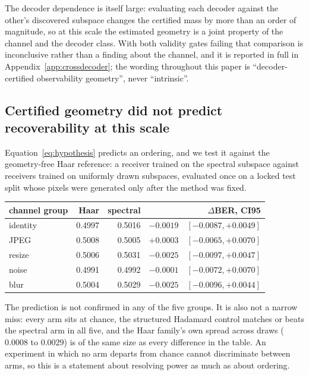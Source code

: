 \documentclass{article}
\theoremstyle{definition}
\begin{document}
The decoder dependence is itself large: evaluating each decoder against the other's
discovered subspace changes the certified mass by more than an order of magnitude, so at
this scale the estimated geometry is a joint property of the channel and the decoder
class. With both validity gates failing that comparison is inconclusive rather than a
finding about the channel, and it is reported in full in Appendix~\ref{app:crossdecoder};
the wording throughout this paper is ``decoder-certified observability geometry'', never
``intrinsic''.

\subsection{Certified geometry did not predict recoverability at this scale}
\label{sec:gate}

Equation~\eqref{eq:hypothesis} predicts an ordering, and we test it against the
geometry-free Haar reference: a receiver trained on the spectral subspace against
receivers trained on uniformly drawn subspaces, evaluated once on a locked test split
whose pixels were generated only after the method was fixed.

\begin{center}
\begin{tabular}{lrrr}
\toprule
channel group & Haar & spectral & $\Delta$BER, CI95 \\
\midrule
identity & 0.4997 & 0.5016 & $-0.0019$\ \ $[-0.0087,+0.0049]$ \\
JPEG     & 0.5008 & 0.5005 & $+0.0003$\ \ $[-0.0065,+0.0070]$ \\
resize   & 0.5006 & 0.5031 & $-0.0025$\ \ $[-0.0097,+0.0047]$ \\
noise    & 0.4991 & 0.4992 & $-0.0001$\ \ $[-0.0072,+0.0070]$ \\
blur     & 0.5004 & 0.5029 & $-0.0025$\ \ $[-0.0096,+0.0044]$ \\
\bottomrule
\end{tabular}
\end{center}

The prediction is not confirmed in any of the five groups. It is also not a narrow miss:
every arm sits at chance, the structured Hadamard control matches or beats the spectral
arm in all five, and the Haar family's own spread across draws ($0.0008$ to $0.0029$)
is of the same size as every difference in the table. An experiment in which no arm
departs from chance cannot discriminate between arms, so this is a statement about
resolving power as much as about ordering.
\end{document}
